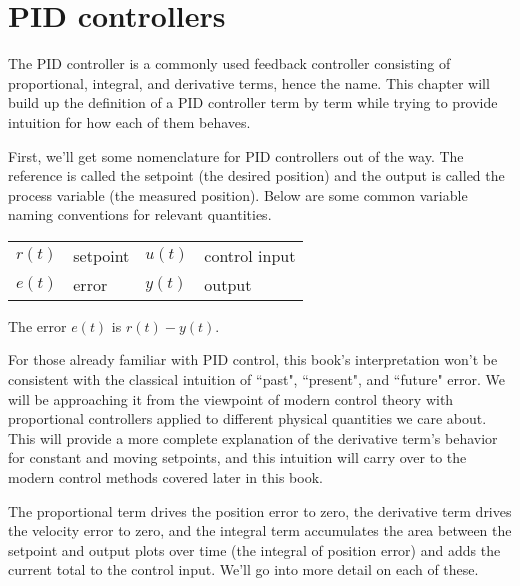 
\chapter{PID controllers}

The PID controller is a commonly used feedback controller consisting of
proportional, integral, and derivative terms, hence the name. This chapter will
build up the definition of a PID controller term by term while trying to provide
intuition for how each of them behaves.

First, we'll get some nomenclature for PID controllers out of the way. The
\gls{reference} is called the \gls{setpoint} (the desired position) and the
\gls{output} is called the \gls{process variable} (the measured position). Below
are some common variable naming conventions for relevant quantities.
\begin{figurekey}
  \begin{tabular}{llll}
    $r(t)$ & \gls{setpoint} & $u(t)$ & \gls{control input} \\
    $e(t)$ & \gls{error} & $y(t)$ & \gls{output}
  \end{tabular}
\end{figurekey}

The \gls{error} $e(t)$ is $r(t) - y(t)$.

For those already familiar with PID control, this book's interpretation won't be
consistent with the classical intuition of ``past", ``present", and ``future"
error. We will be approaching it from the viewpoint of modern control theory
with proportional controllers applied to different physical quantities we care
about. This will provide a more complete explanation of the derivative term's
behavior for constant and moving \glspl{setpoint}, and this intuition will carry
over to the modern control methods covered later in this book.

The proportional term drives the position error to zero, the derivative term
drives the velocity error to zero, and the integral term accumulates the area
between the \gls{setpoint} and \gls{output} plots over time (the integral of
position \gls{error}) and adds the current total to the \gls{control input}.
We'll go into more detail on each of these.

\renewcommand*{\chapterpath}{\partpath/pid-controllers}







